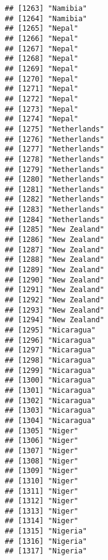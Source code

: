 \documentclass[]{article}
\begin{document}
\begin{verbatim}
## [1263] "Namibia"                            
## [1264] "Namibia"                            
## [1265] "Nepal"                              
## [1266] "Nepal"                              
## [1267] "Nepal"                              
## [1268] "Nepal"                              
## [1269] "Nepal"                              
## [1270] "Nepal"                              
## [1271] "Nepal"                              
## [1272] "Nepal"                              
## [1273] "Nepal"                              
## [1274] "Nepal"                              
## [1275] "Netherlands"                        
## [1276] "Netherlands"                        
## [1277] "Netherlands"                        
## [1278] "Netherlands"                        
## [1279] "Netherlands"                        
## [1280] "Netherlands"                        
## [1281] "Netherlands"                        
## [1282] "Netherlands"                        
## [1283] "Netherlands"                        
## [1284] "Netherlands"                        
## [1285] "New Zealand"                        
## [1286] "New Zealand"                        
## [1287] "New Zealand"                        
## [1288] "New Zealand"                        
## [1289] "New Zealand"                        
## [1290] "New Zealand"                        
## [1291] "New Zealand"                        
## [1292] "New Zealand"                        
## [1293] "New Zealand"                        
## [1294] "New Zealand"                        
## [1295] "Nicaragua"                          
## [1296] "Nicaragua"                          
## [1297] "Nicaragua"                          
## [1298] "Nicaragua"                          
## [1299] "Nicaragua"                          
## [1300] "Nicaragua"                          
## [1301] "Nicaragua"                          
## [1302] "Nicaragua"                          
## [1303] "Nicaragua"                          
## [1304] "Nicaragua"                          
## [1305] "Niger"                              
## [1306] "Niger"                              
## [1307] "Niger"                              
## [1308] "Niger"                              
## [1309] "Niger"                              
## [1310] "Niger"                              
## [1311] "Niger"                              
## [1312] "Niger"                              
## [1313] "Niger"                              
## [1314] "Niger"                              
## [1315] "Nigeria"                            
## [1316] "Nigeria"                            
## [1317] "Nigeria"                            

\end{verbatim}
\end{document}
